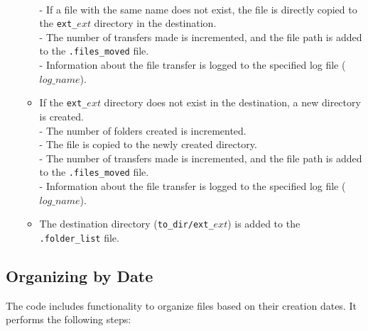 \documentclass[12pt]{article}
\begin{document}
\begin{flushleft}
\begin{enumerate}
\begin{itemize}
                \\- If a file with the same name does not exist, the file is directly copied to the \texttt{ext\_$ext$} directory in the destination.
                \\- The number of transfers made is incremented, and the file path is added to the \texttt{.files\_moved} file.
                \\- Information about the file transfer is logged to the specified log file (\texttt{$log\_name$}).
            \item If the \texttt{ext\_$ext$} directory does not exist in the destination, a new directory is created.
                \\- The number of folders created is incremented.
                \\- The file is copied to the newly created directory.
                \\- The number of transfers made is incremented, and the file path is added to the \texttt{.files\_moved} file.
                \\- Information about the file transfer is logged to the specified log file (\texttt{$log\_name$}).
            \item The destination directory (\texttt{to\_dir/ext\_$ext$}) is added to the \texttt{.folder\_list} file.
        \end{itemize}
    \end{enumerate}
    \end{flushleft}

    \subsection{Organizing by Date}

    The code includes functionality to organize files based on their creation dates. It performs the following steps:
    
\end{document}
